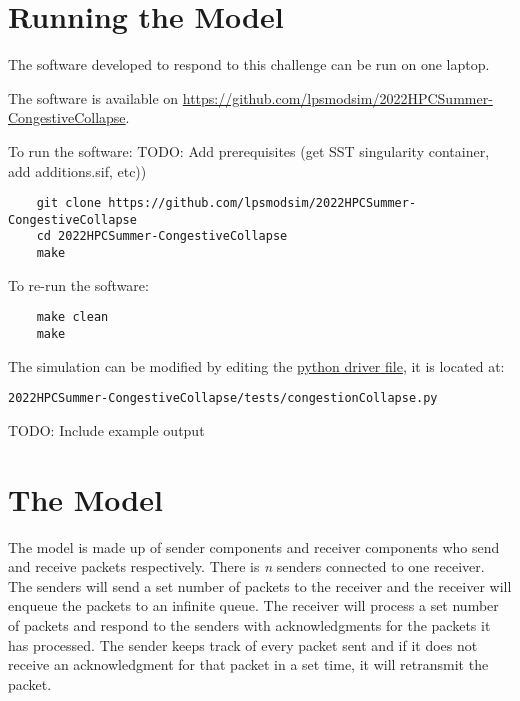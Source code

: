 \documentclass{article}
\begin{document}
\section{Running the Model}

The software developed to respond to this challenge can be run on one laptop.

\noindent The software is available on \href{https://github.com/lpsmodsim/2022HPCSummer-CongestiveCollapse}{https://github.com/lpsmodsim/2022HPCSummer-CongestiveCollapse}.\newline

\noindent To run the software:
\noindent TODO: Add prerequisites (get SST singularity container, add additions.sif, etc))

\begin{verbatim}
	git clone https://github.com/lpsmodsim/2022HPCSummer-CongestiveCollapse
	cd 2022HPCSummer-CongestiveCollapse
	make
\end{verbatim}

\noindent To re-run the software:

\begin{verbatim}
	make clean
	make
\end{verbatim}

\noindent The simulation can be modified by editing the \href{http://sst-simulator.org/SSTPages/SSTUserPythonFileFormat/}{python driver file}, it is located at:

\begin{verbatim}
2022HPCSummer-CongestiveCollapse/tests/congestionCollapse.py
\end{verbatim}

\noindent TODO: Include example output\newline

\section{The Model}

The model is made up of sender components and receiver components who send and receive packets respectively. There is \textit{n} senders connected to one receiver. The senders will send a set number of packets to the receiver and the receiver will enqueue the packets to an infinite queue. The receiver will process a set number of packets and respond to the senders with acknowledgments for the packets it has processed. The sender keeps track of every packet sent and if it does not receive an acknowledgment for that packet in a set time, it will retransmit the packet.
\end{document}
